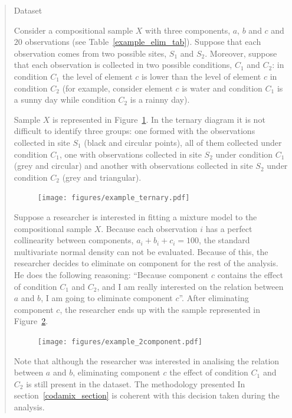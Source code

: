 \documentclass[10pt, a4paper]{article}
\begin{document}
\begin{quote}
\begin{table}
\centering
\scriptsize

\label{example_elim_tab}
\caption{Dataset}
\end{table}

Consider a compositional sample $X$ with three components, $a$, $b$ and $c$ and $20$ observations (see Table~\ref{example_elim_tab}). Suppose that each observation comes from two possible sites, $S_1$ and $S_2$. Moreover, suppose that each observation is collected in two possible conditions, $C_1$ and $C_2$: in condition $C_1$ the level of element $c$ is lower than the level of element $c$ in condition $C_2$ (for example, consider element $c$ is water and condition $C_1$ is a sunny day while condition $C_2$ is a rainny day).

Sample $X$ is represented in Figure~\ref{example_elim_component}. In the ternary diagram it is not difficult to identify three groups: one formed with the observations collected in site $S_1$ (black and circular points), all of them collected under condition $C_1$, one with observations collected in site $S_2$ under condition $C_1$ (grey and circular) and another with observations collected in site $S_2$ under condition $C_2$ (grey and triangular).

\begin{figure}[thbp]
\centering
\texttt{[image: figures/example\_ternary.pdf]}
\caption{}\label{example_elim_component}
\end{figure}

Suppose a researcher is interested in fitting a mixture model to the compositional sample $X$. Because each observation $i$ has a perfect collinearity between components, $a_i+b_i+c_i = 100$, the standard multivariate normal density can not be evaluated. Because of this, the researcher decides to eliminate on component for the rest of the analysis. He does the following reasoning: ``Because component $c$ contains the effect of condition $C_1$ and $C_2$, and I am really interested on the relation between $a$ and $b$, I am going to eliminate component $c$''. After eliminating component $c$, the researcher ends up with the sample represented in Figure~\ref{example_elim_2_components}.

\begin{figure}[thbp]
\centering
\texttt{[image: figures/example\_2component.pdf]}
\caption{}\label{example_elim_2_components}
\end{figure}

Note that although the researcher was interested in analising the relation between $a$ and $b$, eliminating component $c$ the effect of condition $C_1$ and $C_2$  is still present in the dataset. The methodology presented In section~\ref{codamix_section} is coherent with this decision taken during the analysis.

\end{quote}
\end{document}
